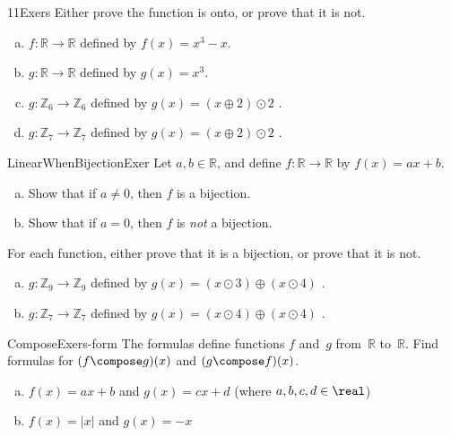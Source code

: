 \begin{exercise}{11Exers}
Either prove the function is onto, or prove that it is not.
\begin{multicols}{2}
 \begin{enumerate}[(a)]
\item \label{11Exers-formula-f}
 $f \colon {\mathbb R} \to {\mathbb R}$ defined by $f(x) = x^3 - x$.
\item \label{11Exers-formula-g}
 $g \colon {\mathbb R} \to {\mathbb R}$ defined by $g(x) = x^3$.
\item \label{modular_g}
 $g \colon {\mathbb Z}_6 \to {\mathbb Z}_6$ defined by $g(x)= (x \oplus 2) \odot 2$ .
\item \label{modular_g}
 $g \colon {\mathbb Z}_7 \to {\mathbb Z}_7$ defined by $g(x)= (x \oplus 2) \odot 2$ .
\end{enumerate}
\end{multicols}
\end{exercise}

\begin{exercise}{LinearWhenBijectionExer}
Let $a,b \in \mathbb{R}$, and define $f \colon \mathbb{R} \to \mathbb{R}$ by $f(x) = a x + b$. 
\begin{enumerate}[(a)]
\item \label{LinearWhenBijectionExer-not0}
Show that if $a \neq 0$, then $f$ is a bijection.
\item \label{LinearWhenBijectionExer-0}
Show that if $a = 0$, then $f$ is \emph{not} a bijection.
\end{enumerate}
\end{exercise}

\begin{exercise}{} 
For each function, either prove that it is a bijection, or prove that it is not.
\begin{enumerate}[(a)]
\item \label{modular9}
 $g \colon {\mathbb Z}_9 \to {\mathbb Z}_9$ defined by $g(x)= (x \odot 3) \oplus  (x \odot 4)$ .
\item \label{modular_m6}
 $g \colon {\mathbb Z}_7 \to {\mathbb Z}_7$ defined by $g(x) = (x \odot 4) \oplus (x \odot 4) $ .
 \end{enumerate}
\end{exercise}

\begin{exercise}{ComposeExers-form} 
 The formulas define functions $f$ and~$g$ from~$\mathbb{R}$ to~$\mathbb{R}$. Find formulas for $(f \compose g)(x)$ and $(g \compose f)(x)$.
\begin{enumerate}[(a)]
\item \label{ComposeExers-form-(ax+b)(cx+d)}
 $f(x) = ax + b$ and $g(x) = c x + d$ (where $a,b,c,d \in \real$)
\item \label{ComposeExers-form-(|x|)(-x)}
 $f(x) = |x|$ and $g(x) = -x$ 
\end{enumerate}
\end{exercise}


